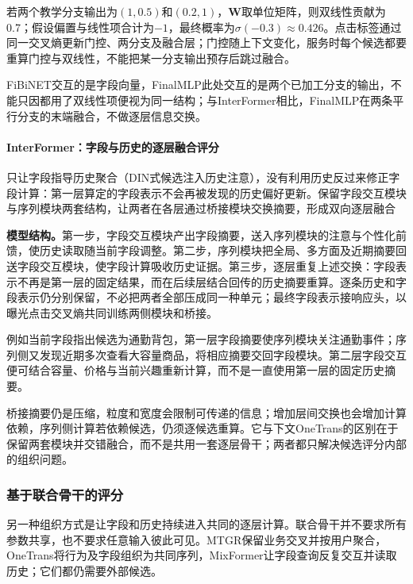 若两个教学分支输出为$(1,0.5)$和$(0.2,1)$，$\bm W$取单位矩阵，则双线性贡献为0.7；假设偏置与线性项合计为$-1$，最终概率为$\sigma(-0.3)\approx0.426$。点击标签通过同一交叉熵更新门控、两分支及融合层；门控随上下文变化，服务时每个候选都要重算门控与双线性，不能把某一分支输出预存后跳过融合。

FiBiNET交互的是字段向量，FinalMLP此处交互的是两个已加工分支的输出，不能只因都用了双线性项便视为同一结构；与InterFormer相比，FinalMLP在两条平行分支的末端融合，不做逐层信息交换。

\paragraph{InterFormer：字段与历史的逐层融合评分}
\label{sec:rs-interformer}

只让字段指导历史聚合（DIN式候选注入历史注意），没有利用历史反过来修正字段计算：第一层算定的字段表示不会再被发现的历史偏好更新。保留字段交互模块与序列模块两套结构，让两者在各层通过桥接模块交换摘要，形成双向逐层融合

\textbf{模型结构。}第一步，字段交互模块产出字段摘要，送入序列模块的注意与个性化前馈，使历史读取随当前字段调整。第二步，序列模块把全局、多方面及近期摘要回送字段交互模块，使字段计算吸收历史证据。第三步，逐层重复上述交换：字段表示不再是第一层的固定结果，而在后续层结合回传的历史摘要重算。逐条历史和字段表示仍分别保留，不必把两者全部压成同一种单元；最终字段表示接响应头，以曝光点击交叉熵共同训练两侧模块和桥接。

例如当前字段指出候选为通勤背包，第一层字段摘要使序列模块关注通勤事件；序列侧又发现近期多次查看大容量商品，将相应摘要交回字段模块。第二层字段交互便可结合容量、价格与当前兴趣重新计算，而不是一直使用第一层的固定历史摘要。

桥接摘要仍是压缩，粒度和宽度会限制可传递的信息；增加层间交换也会增加计算依赖，序列侧计算若依赖候选，仍须逐候选重算。它与下文OneTrans的区别在于保留两套模块并交错融合，而不是共用一套逐层骨干；两者都只解决候选评分内部的组织问题。

\subsubsection{基于联合骨干的评分}
\label{sec:rs-joint-backbone}

另一种组织方式是让字段和历史持续进入共同的逐层计算。联合骨干并不要求所有参数共享，也不要求任意输入彼此可见。MTGR保留业务交叉并按用户聚合，OneTrans将行为及字段组织为共同序列，MixFormer让字段查询反复交互并读取历史；它们都仍需要外部候选。

